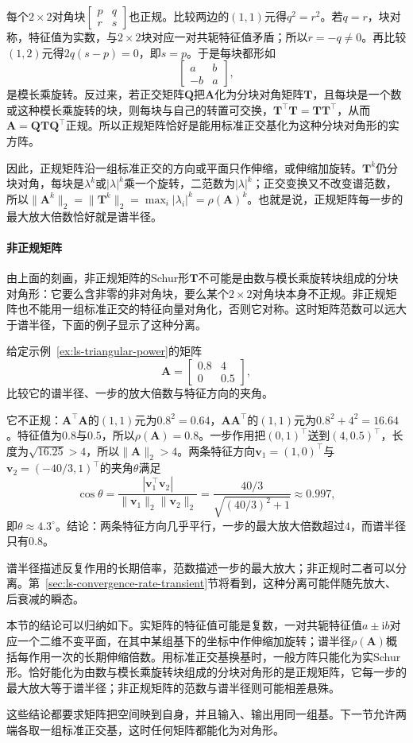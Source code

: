 每个$2\times2$对角块$\left[\begin{smallmatrix}p&q\\r&s\end{smallmatrix}\right]$也正规。比较两边的$(1,1)$元得$q^2=r^2$。若$q=r$，块对称，特征值为实数，与$2\times2$块对应一对共轭特征值矛盾；所以$r=-q\neq0$。再比较$(1,2)$元得$2q(s-p)=0$，即$s=p$。于是每块都形如
\[
 \begin{bmatrix}a&b\\-b&a\end{bmatrix},
\]
是模长乘旋转。反过来，若正交矩阵$\bm Q$把$\bm A$化为分块对角矩阵$\bm T$，且每块是一个数或这种模长乘旋转的块，则每块与自己的转置可交换，$\bm T^\top\bm T=\bm T\bm T^\top$，从而$\bm A=\bm Q\bm T\bm Q^\top$正规。所以正规矩阵恰好是能用标准正交基化为这种分块对角形的实方阵。

因此，正规矩阵沿一组标准正交的方向或平面只作伸缩，或伸缩加旋转。$\bm T^k$仍分块对角，每块是$\lambda^k$或$|\lambda|^k$乘一个旋转，二范数为$|\lambda|^k$；正交变换又不改变谱范数，所以$\lVert\bm A^k\rVert_2=\lVert\bm T^k\rVert_2=\max_i|\lambda_i|^k=\rho(\bm A)^k$。也就是说，正规矩阵每一步的最大放大倍数恰好就是谱半径。

\paragraph{非正规矩阵}
由上面的刻画，非正规矩阵的Schur形$\bm T$不可能是由数与模长乘旋转块组成的分块对角形：它要么含非零的非对角块，要么某个$2\times2$对角块本身不正规。非正规矩阵也不能用一组标准正交的特征向量对角化，否则它对称。这时矩阵范数可以远大于谱半径，下面的例子显示了这种分离。
\begin{example}[非正规矩阵的范数与谱半径]
\label{ex:ls-nonnormal-norm-radius}
给定示例~\ref{ex:ls-triangular-power}的矩阵
\[
 \bm A=\begin{bmatrix}0.8&4\\0&0.5\end{bmatrix},
\]
比较它的谱半径、一步的放大倍数与特征方向的夹角。

它不正规：$\bm A^\top\bm A$的$(1,1)$元为$0.8^2=0.64$，$\bm A\bm A^\top$的$(1,1)$元为$0.8^2+4^2=16.64$。特征值为$0.8$与$0.5$，所以$\rho(\bm A)=0.8$。一步作用把$(0,1)^\top$送到$(4,0.5)^\top$，长度为$\sqrt{16.25}>4$，所以$\lVert\bm A\rVert_2>4$。两条特征方向$\bm v_1=(1,0)^\top$与$\bm v_2=(-40/3,1)^\top$的夹角$\theta$满足
\[
 \cos\theta=\frac{|\bm v_1^\top\bm v_2|}{\lVert\bm v_1\rVert_2\lVert\bm v_2\rVert_2}
 =\frac{40/3}{\sqrt{(40/3)^2+1}}\approx0.997,
\]
即$\theta\approx4.3^\circ$。结论：两条特征方向几乎平行，一步的最大放大倍数超过$4$，而谱半径只有$0.8$。
\end{example}
谱半径描述反复作用的长期倍率，范数描述一步的最大放大；非正规时二者可以分离。第~\ref{sec:ls-convergence-rate-transient}节将看到，这种分离可能伴随先放大、后衰减的瞬态。

本节的结论可以归纳如下。实矩阵的特征值可能是复数，一对共轭特征值$a\pm\mathrm ib$对应一个二维不变平面，在其中某组基下的坐标中作伸缩加旋转；谱半径$\rho(\bm A)$概括每作用一次的长期伸缩倍数。用标准正交基换基时，一般方阵只能化为实Schur形。恰好能化为由数与模长乘旋转块组成的分块对角形的是正规矩阵，它每一步的最大放大等于谱半径；非正规矩阵的范数与谱半径则可能相差悬殊。

这些结论都要求矩阵把空间映到自身，并且输入、输出用同一组基。下一节允许两端各取一组标准正交基，这时任何矩阵都能化为对角形。
